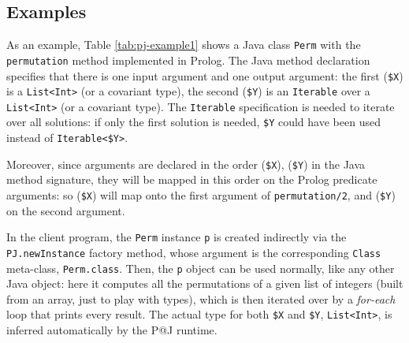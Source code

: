 \subsection{Examples}
\label{ssec:p@j-examples}

As an example, Table \ref{tab:pj-example1} shows a Java class \texttt{Perm} with the \texttt{permutation} method implemented in Prolog.
%
The Java method declaration specifies that there is one input argument and one output argument: the first (\texttt{\$X}) is a \texttt{List<Int>} (or a covariant type), the second (\texttt{\$Y}) is an \texttt{Iterable} over a \texttt{List<Int>} (or a covariant type).
The \texttt{Iterable} specification is needed to iterate over all solutions: if only the first solution is needed, \texttt{\$Y} could have been used instead of \texttt{Iterable<\$Y>}.

Moreover, since arguments are declared in the order (\texttt{\$X}), (\texttt{\$Y}) in the Java method signature, they will be mapped in this order on the Prolog predicate arguments: so (\texttt{\$X}) will map onto the first argument of \texttt{permutation/2}, and (\texttt{\$Y}) on the second argument.

In the client program, the \texttt{Perm} instance \texttt{p} is created indirectly via the \texttt{PJ.newInstance} factory method, whose argument is the corresponding \texttt{Class} meta-class, \texttt{Perm.class}.
Then, the \texttt{p} object can be used normally, like any other Java object: here it computes all the permutations of a given list of integers (built from an array, just to play with types), which is then iterated over by a \textit{for-each} loop that prints every result.
The actual type for both \texttt{\$X} and \texttt{\$Y}, \texttt{List<Int>}, is inferred automatically by the P@J runtime.


